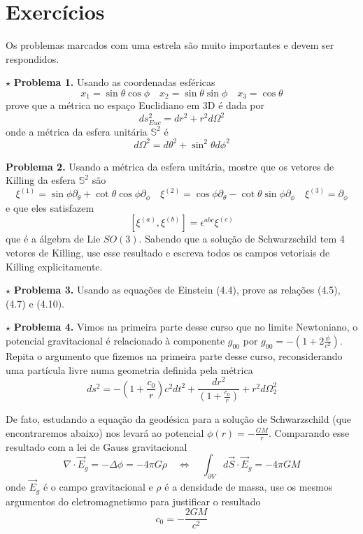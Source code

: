 \documentclass[11pt]{article}
\begin{document}
    \hypertarget{exercuxedcios}{%
\section{Exercícios}\label{exercuxedcios}}

    Os problemas marcados com uma estrela são muito importantes e devem ser
respondidos.

\(\star\) \textbf{Problema 1.} Usando as coordenadas esféricas
\[ x_1 = \sin\theta \cos\phi\quad 
x_2 = \sin\theta \sin\phi\quad  
x_3 = \cos\theta\] prove que a métrica no espaço Euclidiano em 3D é dada
por \[ ds^2_{Euc} = dr^2 + r^2 d\Omega^2 \] onde a métrica da esfera
unitária \(\mathbb{S}^2\) é
\[ d\Omega^2 = d\theta^2 + \sin^2 \theta d\phi^2 \]

\textbf{Problema 2.} Usando a métrica da esfera unitária, mostre que os
vetores de Killing da esfera \(\mathbb{S}^2\) são \[ 
\xi^{(1)} = \sin\phi \partial_\theta + \cot\theta\cos\phi \partial_\phi\quad 
\xi^{(2)} = \cos\phi \partial_\theta - \cot\theta\sin\phi \partial_\phi \quad
\xi^{(3)} = \partial_\phi
\] e que eles satisfazem
\[ [\xi^{(a)}, \xi^{(b)}] = \epsilon^{abc}\xi^{(c)}  \] que é a álgebra
de Lie \(SO(3)\). Sabendo que a solução de Schwarzschild tem 4 vetores
de Killing, use esse resultado e escreva todos os campos vetoriais de
Killing explicitamente.

\(\star\) \textbf{Problema 3.} Usando as equações de Einstein (4.4),
prove as relações (4.5), (4.7) e (4.10).

\(\star\) \textbf{Problema 4.} Vimos na primeira parte desse curso que
no limite Newtoniano, o potencial gravitacional é relacionado à
componente \(g_{00}\) por
\(g_{00} = -\left(1 + 2\frac{\phi}{c^2}\right)\). Repita o argumento que
fizemos na primeira parte desse curso, reconsiderando uma partícula
livre numa geometria definida pela métrica
\[ ds^2 = -\left(1 + \frac{c_0}{r}\right) c^2 dt^2 + \frac{dr^2}{\left(1 + \frac{c_0}{r}\right)} + r^2 d\Omega_2^2 \]

De fato, estudando a equação da geodésica para a solução de
Schwarzschild (que encontraremos abaixo) nos levará ao potencial
\(\phi(r) = - \frac{GM}{r}\). Comparando esse resultado com a lei de
Gauss gravitacional
\[\nabla\cdot \vec{E}_g = -\Delta\phi = - 4 \pi G \rho  \quad \Leftrightarrow \quad 
\int_{\partial V} d \vec{S}\cdot \vec{E}_g  = -4 \pi G M \] onde
\(\vec{E}_g\) é o campo gravitacional e \(\rho\) é a densidade de massa,
use os mesmos argumentos do eletromagnetismo para justificar o resultado
\[ c_0 = - \frac{2GM}{c^2} \]
\end{document}
